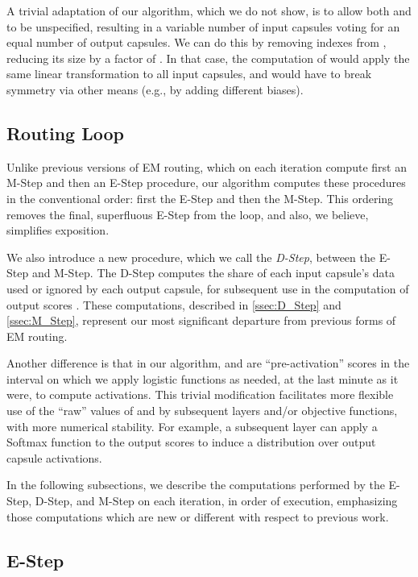 \documentclass[11pt,a4paper]{article}
\begin{document}
A trivial adaptation of our algorithm, which we do not show, is to allow both  and  to be unspecified, resulting in a variable number of input capsules voting for an equal number of output capsules. We can do this by removing indexes  from , reducing its size by a factor of . In that case, the computation of  would apply the same linear transformation to all input capsules, and would have to break symmetry via other means (e.g., by adding different biases).

\subsection{Routing Loop}\label{ssec:routing_iterations}

Unlike previous versions of EM routing, which on each iteration compute first an M-Step and then an E-Step procedure, our algorithm computes these procedures in the conventional order: first the E-Step and then the M-Step. This ordering removes the final, superfluous E-Step from the loop, and also, we believe, simplifies exposition.

We also introduce a new procedure, which we call the \emph{D-Step}, between the E-Step and M-Step. The D-Step computes the share of each input capsule's data used or ignored by each output capsule, for subsequent use in the computation of output scores . These computations, described in \ref{ssec:D_Step} and \ref{ssec:M_Step}, represent our most significant departure from previous forms of EM routing.

Another difference is that in our algorithm,  and  are ``pre-activation'' scores in the interval  on which we apply logistic functions as needed, at the last minute as it were, to compute activations. This trivial modification facilitates more flexible use of the ``raw'' values of  and  by subsequent layers and/or objective functions, with more numerical stability. For example, a subsequent layer can apply a Softmax function to the output scores  to induce a distribution over output capsule activations.

In the following subsections, we describe the computations performed by the E-Step, D-Step, and M-Step on each iteration, in order of execution, emphasizing those computations which are new or different with respect to previous work.

\subsection{E-Step}\label{ssec:E_Step}
\end{document}
